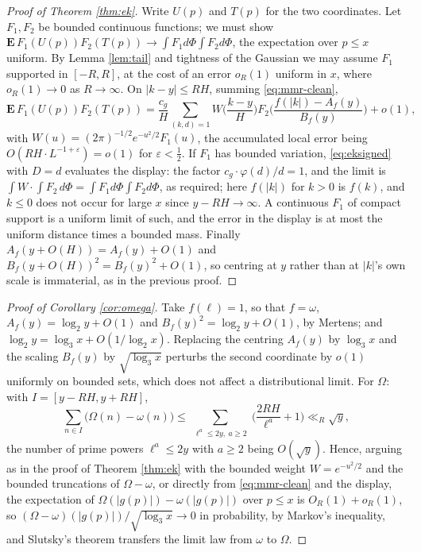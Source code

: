 \documentclass[11pt,reqno]{amsart}
\theoremstyle{plain}
\theoremstyle{definition}
\begin{document}
\begin{proof}[Proof of Theorem \ref{thm:ek}]
Write $U(p)$ and $T(p)$ for the two coordinates. Let $F_1,F_2$ be bounded continuous functions; we must show $\mathbf E\,F_1(U(p))F_2(T(p))\to\int F_1d\Phi\int F_2d\Phi$, the expectation over $p\le x$ uniform. By Lemma \ref{lem:tail} and tightness of the Gaussian we may assume $F_1$ supported in $[-R,R]$, at the cost of an error $o_R(1)$ uniform in $x$, where $o_R(1)\to0$ as $R\to\infty$. On $|k-y|\le RH$, summing \eqref{eq:mmr-clean},
\[
\mathbf E\,F_1(U(p))F_2(T(p))
=\frac{c_g}{H}\sum_{(k,d)=1}W\Big(\frac{k-y}H\Big)F_2\Big(\frac{f(|k|)-A_f(y)}{B_f(y)}\Big)+o(1),
\]
with $W(u)=(2\pi)^{-1/2}e^{-u^{2}/2}F_1(u)$, the accumulated local error being $O(RH\cdot L^{-1+\varepsilon})=o(1)$ for $\varepsilon<\tfrac12$. If $F_1$ has bounded variation, \eqref{eq:eksigned} with $D=d$ evaluates the display: the factor $c_g\cdot\varphi(d)/d=1$, and the limit is $\int W\cdot\int F_2\,d\Phi=\int F_1d\Phi\int F_2d\Phi$, as required; here $f(|k|)$ for $k>0$ is $f(k)$, and $k\le0$ does not occur for large $x$ since $y-RH\to\infty$. A continuous $F_1$ of compact support is a uniform limit of such, and the error in the display is at most the uniform distance times a bounded mass. Finally $A_f(y+O(H))=A_f(y)+O(1)$ and $B_f(y+O(H))^2=B_f(y)^2+O(1)$, so centring at $y$ rather than at $|k|$'s own scale is immaterial, as in the previous proof.
\end{proof}

\begin{proof}[Proof of Corollary \ref{cor:omega}]
Take $f(\ell)=1$, so that $f=\omega$, $A_f(y)=\log_2y+O(1)$ and $B_f(y)^{2}=\log_2y+O(1)$, by Mertens; and $\log_2y=\log_3x+O(1/\log_2x)$. Replacing the centring $A_f(y)$ by $\log_3x$ and the scaling $B_f(y)$ by $\sqrt{\log_3x}$ perturbs the second coordinate by $o(1)$ uniformly on bounded sets, which does not affect a distributional limit. For $\Omega$: with $I=[y-RH,y+RH]$,
\[
\sum_{n\in I}\big(\Omega(n)-\omega(n)\big)
\le\sum_{\substack{\ell^{a}\le2y,\ a\ge2}}\Big(\frac{2RH}{\ell^{a}}+1\Big)
\ll_R\sqrt y,
\]
the number of prime powers $\ell^a\le2y$ with $a\ge2$ being $O(\sqrt y)$. Hence, arguing as in the proof of Theorem \ref{thm:ek} with the bounded weight $W=e^{-u^2/2}$ and the bounded truncations of $\Omega-\omega$, or directly from \eqref{eq:mmr-clean} and the display, the expectation of $\Omega(|g(p)|)-\omega(|g(p)|)$ over $p\le x$ is $O_R(1)+o_R(1)$, so $(\Omega-\omega)(|g(p)|)/\sqrt{\log_3x}\to0$ in probability, by Markov's inequality, and Slutsky's theorem transfers the limit law from $\omega$ to $\Omega$.
\end{proof}
\end{document}
